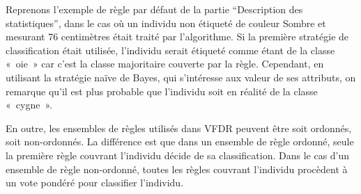             Reprenons l’exemple de règle par défaut de la partie “Description des statistiques”, dans le cas où un individu non étiqueté de couleur Sombre et mesurant 76 centimètres était traité par l’algorithme. Si la première stratégie de classification était utilisée, l’individu serait étiqueté comme étant de la classe «~oie~» car c’est la classe majoritaire couverte par la règle. Cependant, en utilisant la stratégie naïve de Bayes, qui s'intéresse aux valeur de ses attributs, on remarque qu’il est plus probable que l’individu soit en réalité de la classe «~cygne~». 

            En outre, les ensembles de règles utilisés dans VFDR peuvent être soit ordonnés, soit non-ordonnés. La différence est que dans un ensemble de règle ordonné, seule la première règle couvrant l’individu décide de sa classification. Dans le cas d’un ensemble de règle non-ordonné, toutes les règles couvrant l’individu procèdent à un vote pondéré pour classifier l’individu.





